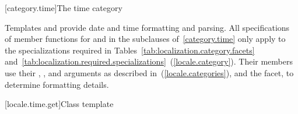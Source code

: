 [category.time]{The time category}

\pnum
Templates
and
provide date and time formatting and parsing.
All specifications of member functions for
and
in the subclauses of~\ref{category.time} only apply to the
specializations required in Tables~\ref{tab:localization.category.facets}
and~\ref{tab:localization.required.specializations}~(\ref{locale.category}).
Their members use their
,
,
and
arguments as described in~(\ref{locale.categories}), and the
facet, to determine formatting details.

[locale.time.get]{Class template }

%
